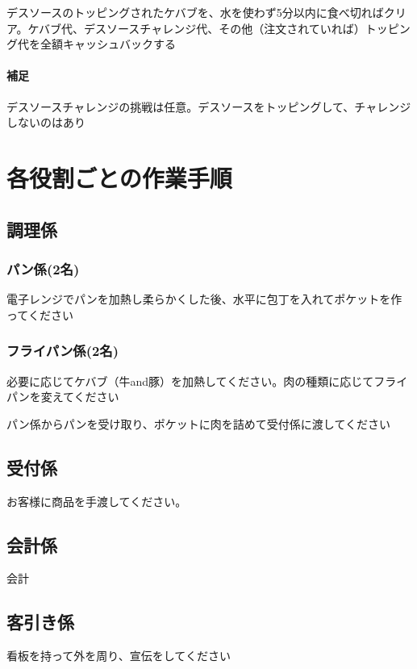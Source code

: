 \documentclass[10pt,a4paper]{jarticle}
\begin{document}
デスソースのトッピングされたケバブを、水を使わず5分以内に食べ切ればクリア。ケバブ代、デスソースチャレンジ代、その他（注文されていれば）トッピング代を全額キャッシュバックする

\paragraph{補足}
デスソースチャレンジの挑戦は任意。デスソースをトッピングして、チャレンジしないのはあり


\section{各役割ごとの作業手順}
\subsection{調理係}
\subsubsection{パン係(2名)}
電子レンジでパンを加熱し柔らかくした後、水平に包丁を入れてポケットを作ってください
\subsubsection{フライパン係(2名)}
必要に応じてケバブ（牛and豚）を加熱してください。肉の種類に応じてフライパンを変えてください

パン係からパンを受け取り、ポケットに肉を詰めて受付係に渡してください

\subsection{受付係}
お客様に商品を手渡してください。

\subsection{会計係}
会計

\subsection{客引き係}
看板を持って外を周り、宣伝をしてください
\end{document}
